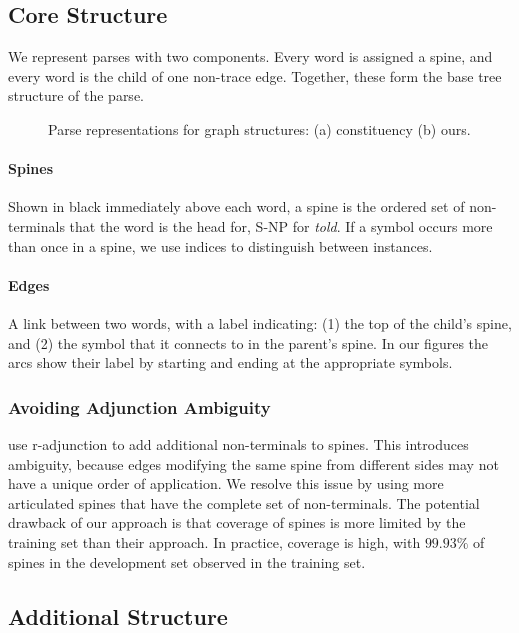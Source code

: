 \subsection{Core Structure} \label{sec:rep-core}

We represent parses with two components.
Every word is assigned a spine, and every word is the child of one non-trace edge.
Together, these form the base tree structure of the parse.

\begin{figure}
  \centering
  \scalebox{1.0}{
    
  }
  \caption[Parse representations for graph structures.]{ \label{fig:repr2}
    Parse representations for graph structures: (a) constituency (b) ours.
  }
\end{figure}

\paragraph{Spines}
Shown in black immediately above each word, a spine is the ordered set of non-terminals that the word is the head for, \myeg S-NP for \emph{told}.
If a symbol occurs more than once in a spine, we use indices to distinguish between instances.

\paragraph{Edges}
A link between two words, with a label indicating: (1) the top of the child's spine, and (2) the symbol that it connects to in the parent's spine.
In our figures the arcs show their label by starting and ending at the appropriate symbols.

\subsubsection{Avoiding Adjunction Ambiguity}

\textcite{cck} use r-adjunction to add additional non-terminals to spines.
This introduces ambiguity, because edges modifying the same spine from different sides may not have a unique order of application.
We resolve this issue by using more articulated spines that have the complete set of non-terminals.
The potential drawback of our approach is that coverage of spines is more limited by the training set than their approach.
In practice, coverage is high, with $99.93\%$ of spines in the development set observed in the training set.

\subsection{Additional Structure} \label{sec:rep-other}

